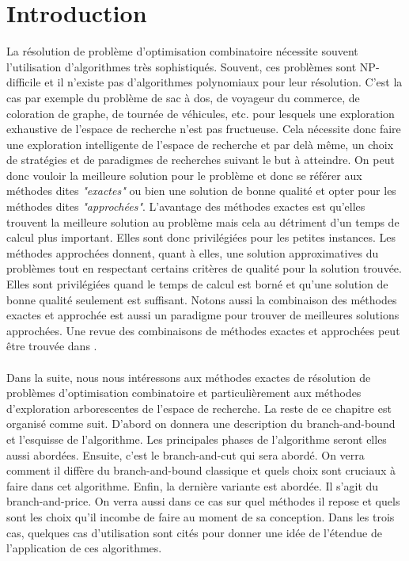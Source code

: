 \documentclass[12pt,a4paper,oneside]{book}
\theoremstyle{definition}
\begin{document}
	\section{Introduction}
	La résolution de problème d'optimisation combinatoire nécessite souvent l'utilisation d'algorithmes très sophistiqués. Souvent, ces problèmes sont NP-difficile et il n'existe pas d'algorithmes polynomiaux pour leur résolution. C'est la cas par exemple du problème de sac à dos, de voyageur du commerce, de coloration de graphe, de tournée de véhicules, etc. pour lesquels une exploration exhaustive de l'espace de recherche n'est pas fructueuse. Cela nécessite donc faire une exploration intelligente de l'espace de recherche et par delà même, un choix de stratégies et de paradigmes de recherches suivant le but à atteindre. On peut donc vouloir la meilleure solution pour le problème et donc se référer aux méthodes dites \textit{"exactes"} ou bien une solution de bonne qualité et opter pour les méthodes dites \textit{"approchées"}. L'avantage des méthodes exactes est qu'elles trouvent la meilleure solution au problème mais cela au détriment d'un temps de calcul plus important. Elles sont donc privilégiées pour les petites instances. Les méthodes approchées donnent, quant à elles, une solution approximatives du problèmes tout en respectant certains critères de qualité pour la solution trouvée. Elles sont privilégiées quand le temps de calcul est borné et qu'une solution de bonne qualité seulement est suffisant. Notons aussi la combinaison des méthodes exactes et approchée est aussi un paradigme pour trouver de meilleures solutions approchées. Une revue des combinaisons de méthodes exactes et approchées peut être trouvée dans \cite{Puchinger2005}. 
	\paragraph{}
	Dans la suite, nous nous intéressons aux méthodes exactes de résolution de problèmes d'optimisation combinatoire et particulièrement aux méthodes d'exploration arborescentes de l'espace de recherche. 
	La reste de ce chapitre est organisé comme suit. D'abord on donnera une description du branch-and-bound et l'esquisse de l'algorithme. Les principales phases de l'algorithme seront elles aussi abordées. Ensuite, c'est le branch-and-cut qui sera abordé. On verra comment il diffère du branch-and-bound classique et quels choix sont cruciaux à faire dans cet algorithme. Enfin, la dernière variante est abordée. Il s'agit du branch-and-price. On verra aussi dans ce cas sur quel méthodes il repose et quels sont les choix qu'il incombe de faire au moment de sa conception. Dans les trois cas, quelques cas d'utilisation sont cités pour donner une idée de l'étendue de l'application de ces algorithmes.
	 
\end{document}
